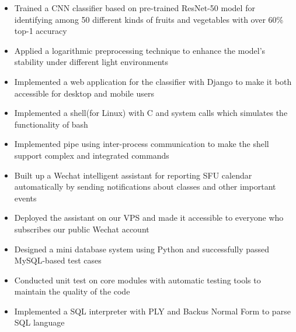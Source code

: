 \documentclass[12pt,a4paper,sans]{moderncv}   %
\begin{document}
{%
\begin{itemize}%
\item Trained a CNN classifier based on pre-trained ResNet-50 model for identifying among 50 different kinds of fruits and vegetables with over 60\% top-1 accuracy%
\item Applied a logarithmic preprocessing technique to enhance the model's stability under different light environments
\item Implemented a web application for the classifier with Django to make it both accessible for desktop and mobile users
\end{itemize}
}

{%
\begin{itemize}%
\item Implemented a shell(for Linux) with C and system calls which simulates the functionality of bash%
\item Implemented pipe using inter-process communication to make the shell support complex and integrated commands
\end{itemize}
}


{%
\begin{itemize}%
\item Built up a Wechat intelligent assistant for reporting SFU calendar automatically by sending notifications about classes and other important events%
\item Deployed the assistant on our VPS and made it accessible to everyone who subscribes our public Wechat account
\end{itemize}
}

{%
\begin{itemize}%
\item Designed a mini database system using Python and successfully passed MySQL-based test cases
%
\item Conducted unit test on core modules with automatic testing tools to maintain the quality of the code
%
\item Implemented a SQL interpreter with PLY and Backus Normal Form to parse SQL language
%
\end{itemize}
}
\end{document}
